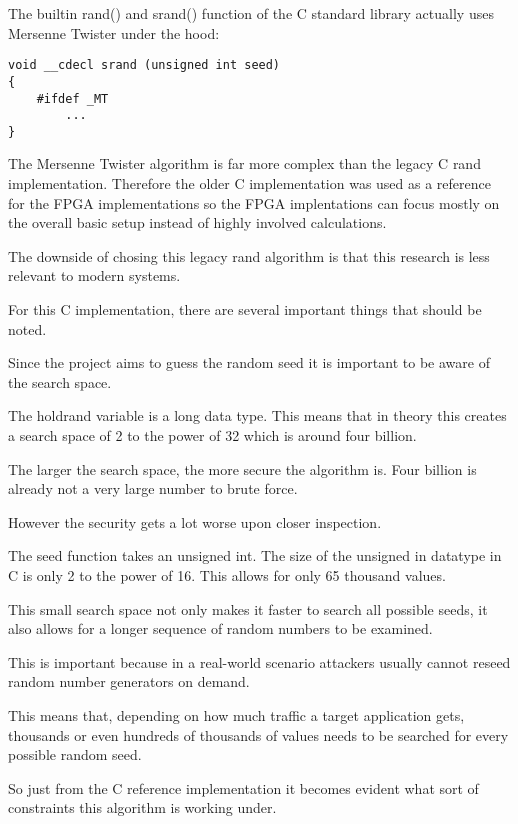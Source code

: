 \documentclass{article}
\begin{document}
\begin{multicols}{2}
    The builtin rand() and srand() function of the C
    standard library actually uses Mersenne Twister under the
    hood:

    \begin{lstlisting}
void __cdecl srand (unsigned int seed)
{
    #ifdef _MT
        ...
}
    \end{lstlisting}

    The Mersenne Twister algorithm is far more complex
    than the legacy C rand implementation. Therefore the older
    C implementation was used as a reference for the FPGA
    implementations so the FPGA implentations can focus
    mostly on the overall basic setup instead of
    highly involved calculations.

    The downside of chosing this legacy rand algorithm is that
    this research is less relevant to modern systems.

    For this C implementation, there are several important things
    that should be noted.

    Since the project aims to guess the random seed it is important
    to be aware of the search space.

    The holdrand variable is a long data type. This means that in theory
    this creates a search space of 2 to the power of 32 which is around four billion.

    The larger the search space, the more secure the algorithm is.
    Four billion is already not a very large number to brute force.

    However the security gets a lot worse upon closer inspection.

    The seed function takes an unsigned int. The size of the unsigned in datatype
    in C is only 2 to the power of 16. This allows for only 65 thousand values.

    This small search space not only makes it faster to search all possible seeds,
    it also allows for a longer sequence of random numbers to be examined.

    This is important because in a real-world scenario attackers usually cannot
    reseed random number generators on demand.

    This means that, depending on how much traffic a target application gets,
    thousands or even hundreds of thousands of values needs to be searched for
    every possible random seed.

    So just from the C reference implementation it becomes evident what sort
    of constraints this algorithm is working under.


\end{multicols}
\end{document}
